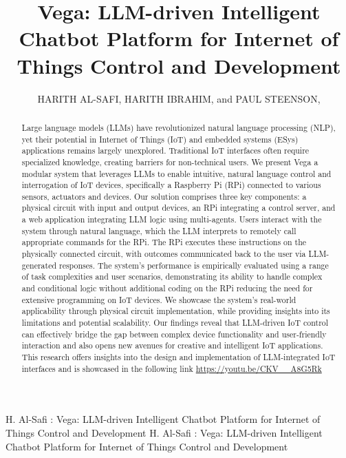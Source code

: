 \documentclass{ieeeaccess}
\begin{document}

\title{Vega: LLM-driven Intelligent Chatbot Platform for Internet of Things Control and Development}
\author{\uppercase{Harith Al-Safi},
    \uppercase{Harith Ibrahim}, and {\uppercase{Paul Steenson},
    }}

\address{School of Electronics and Electrical Engineering, University of Leeds,
    Leeds LS2 9JT, U.K}

\markboth
{H. Al-Safi \headeretal: Vega: LLM-driven Intelligent Chatbot Platform for Internet of Things Control and Development}
{H. Al-Safi \headeretal: Vega: LLM-driven Intelligent Chatbot Platform for Internet of Things Control and Development}


\begin{abstract}
    Large language models (LLMs) have revolutionized natural language processing (NLP), yet their potential in Internet of Things (IoT) and embedded systems (ESys) applications remains largely unexplored. Traditional IoT interfaces often require specialized knowledge, creating barriers for non-technical users. We present Vega a modular system that leverages LLMs to enable intuitive, natural language control and interrogation of IoT devices, specifically a Raspberry Pi (RPi) connected to various sensors, actuators and devices. Our solution comprises three key components: a physical circuit with input and output devices, an RPi integrating a control server, and a web application integrating LLM logic using multi-agents. Users interact with the system through natural language, which the LLM interprets to remotely call appropriate commands for the RPi. The RPi executes these instructions on the physically connected circuit, with outcomes communicated back to the user via LLM-generated responses. The system's performance is empirically evaluated using a range of task complexities and user scenarios, demonstrating its ability to handle complex and conditional logic without additional coding on the RPi reducing the need for extensive programming on IoT devices. We showcase the system's real-world applicability through physical circuit implementation, while providing insights into its limitations and potential scalability. Our findings reveal that LLM-driven IoT control can effectively bridge the gap between complex device functionality and user-friendly interaction and also opens new avenues for creative and intelligent IoT applications. This research offers insights into the design and implementation of LLM-integrated IoT interfaces and is showcased in the following link \url{https://youtu.be/CKV\_\_A8G5Rk}
\end{abstract}
\end{document}
